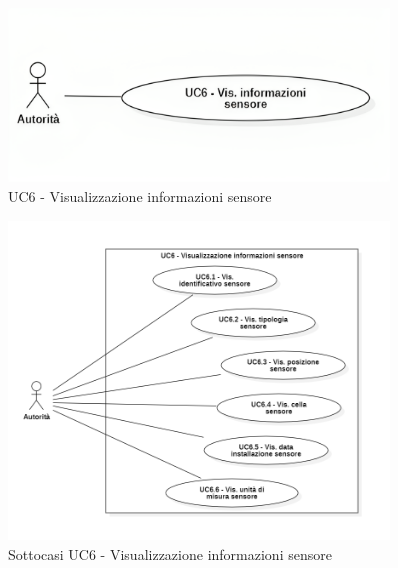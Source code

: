 


\begin{figure}[H]
    \centering
    \includegraphics[width=0.9\textwidth]{../Images/uc6.png}
    \caption{UC6 - Visualizzazione informazioni sensore}
    \label{fig:UC6}
\end{figure}


\begin{figure}[H]
    \centering
    \includegraphics[width=0.9\textwidth]{../Images/uc6_Subcase.PNG}
    \caption{Sottocasi UC6 - Visualizzazione informazioni sensore}
    \label{fig:UC6_sub}
\end{figure}



